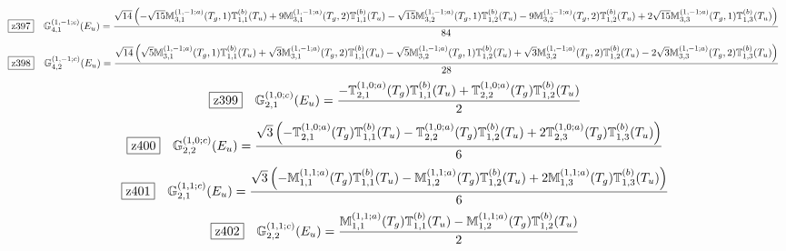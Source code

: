 \documentclass[fleqn,10pt,landscape]{jsarticle}
\begin{document}
\begin{dmath*}
\hspace*{3mm}\fbox{z397}\quad \mathbb{G}_{4,1}^{(1,-1;c)}(E_{u})=\frac{\sqrt{14} \left(- \sqrt{15} \mathbb{M}_{3,1}^{(1,-1;a)}(T_{g},1) \mathbb{T}_{1,1}^{(b)}(T_{u}) + 9 \mathbb{M}_{3,1}^{(1,-1;a)}(T_{g},2) \mathbb{T}_{1,1}^{(b)}(T_{u}) - \sqrt{15} \mathbb{M}_{3,2}^{(1,-1;a)}(T_{g},1) \mathbb{T}_{1,2}^{(b)}(T_{u}) - 9 \mathbb{M}_{3,2}^{(1,-1;a)}(T_{g},2) \mathbb{T}_{1,2}^{(b)}(T_{u}) + 2 \sqrt{15} \mathbb{M}_{3,3}^{(1,-1;a)}(T_{g},1) \mathbb{T}_{1,3}^{(b)}(T_{u})\right)}{84}
\end{dmath*}
\begin{dmath*}
\hspace*{3mm}\fbox{z398}\quad \mathbb{G}_{4,2}^{(1,-1;c)}(E_{u})=\frac{\sqrt{14} \left(\sqrt{5} \mathbb{M}_{3,1}^{(1,-1;a)}(T_{g},1) \mathbb{T}_{1,1}^{(b)}(T_{u}) + \sqrt{3} \mathbb{M}_{3,1}^{(1,-1;a)}(T_{g},2) \mathbb{T}_{1,1}^{(b)}(T_{u}) - \sqrt{5} \mathbb{M}_{3,2}^{(1,-1;a)}(T_{g},1) \mathbb{T}_{1,2}^{(b)}(T_{u}) + \sqrt{3} \mathbb{M}_{3,2}^{(1,-1;a)}(T_{g},2) \mathbb{T}_{1,2}^{(b)}(T_{u}) - 2 \sqrt{3} \mathbb{M}_{3,3}^{(1,-1;a)}(T_{g},2) \mathbb{T}_{1,3}^{(b)}(T_{u})\right)}{28}
\end{dmath*}
\begin{dmath*}
\hspace*{3mm}\fbox{z399}\quad \mathbb{G}_{2,1}^{(1,0;c)}(E_{u})=\frac{- \mathbb{T}_{2,1}^{(1,0;a)}(T_{g}) \mathbb{T}_{1,1}^{(b)}(T_{u}) + \mathbb{T}_{2,2}^{(1,0;a)}(T_{g}) \mathbb{T}_{1,2}^{(b)}(T_{u})}{2}
\end{dmath*}
\begin{dmath*}
\hspace*{3mm}\fbox{z400}\quad \mathbb{G}_{2,2}^{(1,0;c)}(E_{u})=\frac{\sqrt{3} \left(- \mathbb{T}_{2,1}^{(1,0;a)}(T_{g}) \mathbb{T}_{1,1}^{(b)}(T_{u}) - \mathbb{T}_{2,2}^{(1,0;a)}(T_{g}) \mathbb{T}_{1,2}^{(b)}(T_{u}) + 2 \mathbb{T}_{2,3}^{(1,0;a)}(T_{g}) \mathbb{T}_{1,3}^{(b)}(T_{u})\right)}{6}
\end{dmath*}
\begin{dmath*}
\hspace*{3mm}\fbox{z401}\quad \mathbb{G}_{2,1}^{(1,1;c)}(E_{u})=\frac{\sqrt{3} \left(- \mathbb{M}_{1,1}^{(1,1;a)}(T_{g}) \mathbb{T}_{1,1}^{(b)}(T_{u}) - \mathbb{M}_{1,2}^{(1,1;a)}(T_{g}) \mathbb{T}_{1,2}^{(b)}(T_{u}) + 2 \mathbb{M}_{1,3}^{(1,1;a)}(T_{g}) \mathbb{T}_{1,3}^{(b)}(T_{u})\right)}{6}
\end{dmath*}
\begin{dmath*}
\hspace*{3mm}\fbox{z402}\quad \mathbb{G}_{2,2}^{(1,1;c)}(E_{u})=\frac{\mathbb{M}_{1,1}^{(1,1;a)}(T_{g}) \mathbb{T}_{1,1}^{(b)}(T_{u}) - \mathbb{M}_{1,2}^{(1,1;a)}(T_{g}) \mathbb{T}_{1,2}^{(b)}(T_{u})}{2}
\end{dmath*}
\end{document}
